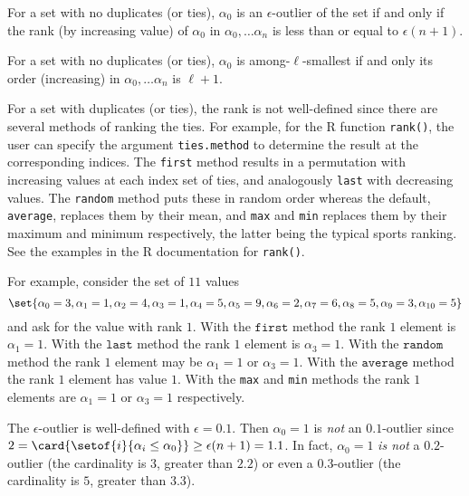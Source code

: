 \documentclass[12pt]{article}
\begin{document}
\begin{solution}
    For a set with no duplicates (or ties), \( \alpha_0 \) is an \(
    \epsilon \)-outlier of the set if and only if the rank (by
    increasing value) of \( \alpha_0 \) in \( \alpha_0, \dots \alpha_n \)
    is less than or equal to \( \epsilon(n+1) \).

    For a set with no duplicates (or ties), \( \alpha_0 \) is among-\(
    \ell \)-smallest if and only its order (increasing) in \( \alpha_0,
    \dots \alpha_n \) is \( \ell + 1 \).

    For a set with duplicates (or ties), the rank is not well-defined
    since there are several methods of ranking the ties.  For example,
    for the R function \texttt{rank()}, the user can specify the
    argument \texttt{ties.method} to determine the result at the
    corresponding indices.  The \texttt{first} method results in a
    permutation with increasing values at each index set of ties, and
    analogously \texttt{last} with decreasing values.  The \texttt{random}
    method puts these in random order whereas the default, \texttt{average},
    replaces them by their mean, and \texttt{max} and \texttt{min}
    replaces them by their maximum and minimum respectively, the latter
    being the typical sports ranking.  See the examples in the R
    documentation for \texttt{rank()}.

    For example, consider the set of \( 11 \) values
    \[
      \set{\alpha_0 =
    3, \alpha_1 = 1, \alpha_2 = 4, \alpha_3 = 1, \alpha_4 = 5, \alpha_5
    = 9, \alpha_6 = 2, \alpha_7 = 6, \alpha_8 = 5, \alpha_9 = 3, \alpha_
    {10} = 5}
    \]
    and ask for the value with rank \( 1 \).  With the \(
    \texttt{first} \) method the rank \( 1 \) element is \( \alpha_1 = 1
    \).  With the \( \texttt{last} \) method the rank \( 1 \) element is
    \( \alpha_3 = 1 \).  With the \( \texttt{random} \) method the rank \(
    1 \) element may be \( \alpha_1 = 1 \) or \( \alpha_3 = 1 \).  With
    the \( \texttt{average} \) method the rank \( 1 \) element has value
    \( 1 \).  With the \texttt{max} and \texttt{min} methods the rank \(
    1 \) elements are \( \alpha_1 = 1 \) or \( \alpha_3 = 1 \)
    respectively.

    The \( \epsilon \)-outlier is well-defined with \( \epsilon = 0.1 \).
    Then \( \alpha_0 = 1 \) is \emph{not} an \( 0.1 \)-outlier since \(
    2 = \card{%
    \setof{i}{\alpha_i \le \alpha_0}} \ge \epsilon(n+1) = 1.1 \).  In
    fact, \( \alpha_0 = 1 \) \emph{is not} a \( 0.2 \)-outlier (the
    cardinality is \( 3 \), greater than \( 2.2 \)) or even a \( 0.3 \)-outlier
    (the cardinality is \( 5 \), greater than \( 3.3 \)).
\end{solution}
\end{document}

